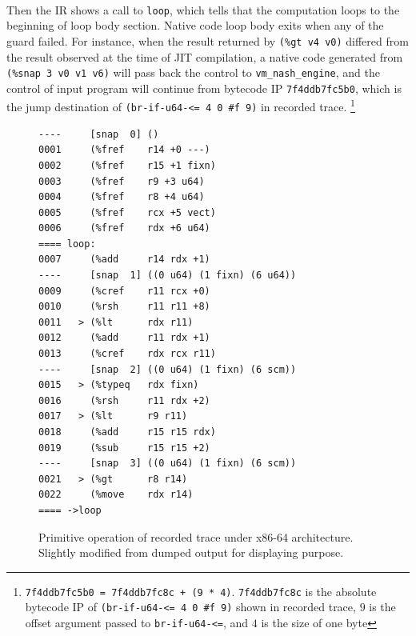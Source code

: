 \documentclass[preprint, 10pt]{sigplanconf}
\begin{document}
\paragraph{} Then the IR shows a call to \texttt{loop}, which tells that the
computation loops to the beginning of loop body section. Native code loop body
exits when any of the guard failed.  For instance, when the result returned by
\texttt{(\%gt~v4~v0)} differed from the result observed at the time of JIT
compilation, a native code generated from \texttt{(\%snap 3 v0 v1 v6)} will pass
back the control to \texttt{vm\_nash\_engine}, and the control of input program
will continue from bytecode IP \texttt{7f4ddb7fc5b0}, which is the jump
destination of \texttt{(br-if-u64-<=~4~0~\#f~9)} in recorded trace.
\footnote{ \texttt{7f4ddb7fc5b0 = 7f4ddb7fc8c + (9 * 4)}.  \texttt{7f4ddb7fc8c}
  is the absolute bytecode IP of \texttt{(br-if-u64-<= 4 0 \#f 9)} shown in
  recorded trace, $9$ is the offset argument passed to \texttt{br-if-u64-<=},
  and $4$ is the size of one byte}


\begin{figure}
  \centering
  \small
\begin{verbatim}
----     [snap  0] ()
0001     (%fref    r14 +0 ---)
0002     (%fref    r15 +1 fixn)
0003     (%fref    r9 +3 u64)
0004     (%fref    r8 +4 u64)
0005     (%fref    rcx +5 vect)
0006     (%fref    rdx +6 u64)
==== loop:
0007     (%add     r14 rdx +1)
----     [snap  1] ((0 u64) (1 fixn) (6 u64))
0009     (%cref    r11 rcx +0)
0010     (%rsh     r11 r11 +8)
0011   > (%lt      rdx r11)
0012     (%add     r11 rdx +1)
0013     (%cref    rdx rcx r11)
----     [snap  2] ((0 u64) (1 fixn) (6 scm))
0015   > (%typeq   rdx fixn)
0016     (%rsh     r11 rdx +2)
0017   > (%lt      r9 r11)
0018     (%add     r15 r15 rdx)
0019     (%sub     r15 r15 +2)
----     [snap  3] ((0 u64) (1 fixn) (6 scm))
0021   > (%gt      r8 r14)
0022     (%move    rdx r14)
==== ->loop
\end{verbatim}
\caption{Primitive operation of recorded trace under x86-64
  architecture. Slightly modified from dumped output for displaying purpose.}
\label{fig:primops}
\end{figure}
\end{document}
